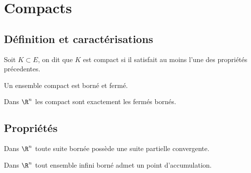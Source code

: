 
\section{Compacts}

\subsection{Définition et caractérisations}

\begin{definition}
    Soit $K \subset E$, on dit que $K$ est compact si il satisfait au moins l'une des propriétés précedentes. 
\end{definition}

\begin{proposition}
    Un ensemble compact est borné et fermé. 
\end{proposition}

\begin{corollary}
    Dans $\R^n$ les compact sont exactement les fermés bornés. 
\end{corollary}

\subsection{Propriétés}

\begin{corollary}
    Dans $\R^n$ toute suite bornée possède une suite partielle convergente. 
\end{corollary}

\begin{corollary}
    Dans $\R^n$ tout ensemble infini borné admet un point d'accumulation. 
\end{corollary}


